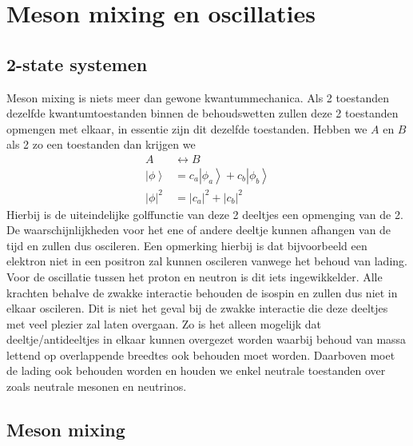 \documentclass[../main.tex]{subfiles}
\begin{document}
\section{Meson mixing en oscillaties}%
\label{sec:meson_mixing_en_oscillaties}

\subsection{2-state systemen}%
\label{sub:2_state_systemen}

Meson mixing is niets meer dan gewone kwantummechanica. Als 2 toestanden dezelfde kwantumtoestanden binnen de behoudswetten zullen deze 2 toestanden opmengen met elkaar, in essentie zijn dit dezelfde toestanden. Hebben we $A$ en $B$ als 2 zo een toestanden dan krijgen we
\begin{equation}
    \begin{aligned}
        \label{eq:opmenhing_2_toestanden}
        A & \leftrightarrow B \\
        \left| \phi\right>&=c_{a}\left|\phi_{a}\right>+c_{b}\left| \phi_{b} \right>\\
        |\phi|^{2} &=\left|c_{a}\right|^{2}+\left|c_{b}\right|^{2}
    \end{aligned}
\end{equation}
Hierbij is de uiteindelijke golffunctie van deze 2 deeltjes een opmenging van de 2. De waarschijnlijkheden voor het ene of andere deeltje kunnen afhangen van de tijd en zullen dus oscileren. Een opmerking hierbij is dat bijvoorbeeld een elektron niet in een positron zal kunnen oscileren vanwege het behoud van lading. Voor de oscillatie tussen het proton en neutron is dit iets ingewikkelder. Alle krachten behalve de zwakke interactie behouden de isospin en zullen dus niet in elkaar oscileren. Dit is niet het geval bij de zwakke interactie die deze deeltjes met veel plezier zal laten overgaan. Zo is het alleen mogelijk dat deeltje/antideeltjes in elkaar kunnen overgezet worden waarbij behoud van massa lettend op overlappende breedtes ook behouden moet worden. Daarboven moet de lading ook behouden worden en houden we enkel neutrale toestanden over zoals neutrale mesonen en neutrinos.

\subsection{Meson mixing}%
\label{sub:meson_mixing}
\end{document}
